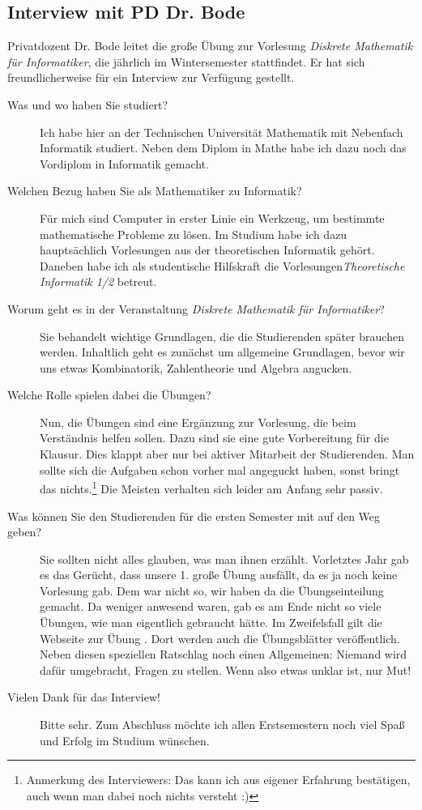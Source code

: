 \subsection{Interview mit PD Dr. Bode}
	Privatdozent Dr. Bode leitet die große Übung zur Vorlesung \emph{Diskrete Mathematik für Informatiker}, die jährlich im Wintersemester stattfindet. Er hat sich freundlicherweise für ein Interview zur Verfügung gestellt.
	\begin{description}
		\item[Was und wo haben Sie studiert?] 

		Ich habe hier an der Technischen Universität Mathematik mit Nebenfach Informatik studiert. Neben dem Diplom in Mathe habe ich dazu noch das Vordiplom in Informatik gemacht.
		\item[Welchen Bezug haben Sie als Mathematiker zu Informatik?] 

		Für mich sind Computer in erster Linie ein Werkzeug, um bestimmte mathematische Probleme zu lösen. Im Studium habe ich dazu hauptsächlich Vorlesungen aus der theoretischen Informatik gehört. Daneben habe ich als studentische Hilfskraft die Vorlesungen\emph{Theoretische Informatik 1/2} betreut.
		\item[Worum geht es in der Veranstaltung \emph{Diskrete Mathematik für Informatiker}?] 

		Sie behandelt wichtige Grundlagen, die die Studierenden später brauchen werden. Inhaltlich geht es zunächst um allgemeine Grundlagen, bevor wir uns etwas Kombinatorik, Zahlentheorie und Algebra angucken.
		\item[Welche Rolle spielen dabei die Übungen?] 

		Nun, die Übungen sind eine Ergänzung zur Vorlesung, die beim Verständnis helfen sollen. Dazu sind sie eine gute Vorbereitung für die Klausur. Dies klappt aber nur bei aktiver Mitarbeit der Studierenden. Man sollte sich die Aufgaben schon vorher mal angeguckt haben, sonst bringt das nichts.\footnote{Anmerkung des Interviewers: Das kann ich aus eigener Erfahrung bestätigen, auch wenn man dabei noch nichts versteht :)} Die Meisten verhalten sich leider am Anfang sehr passiv.
		\item[Was können Sie den Studierenden für die ersten Semester mit auf den Weg geben?] 

		Sie sollten  nicht alles glauben, was man ihnen erzählt. Vorletztes Jahr gab es das Gerücht, dass unsere 1. große Übung ausfällt, da es ja noch keine Vorlesung gab. Dem war nicht so, wir haben da die Übungseinteilung gemacht. Da weniger anwesend waren, gab es am Ende nicht so viele Übungen, wie man eigentlich gebraucht hätte. Im Zweifelsfall gilt die Webseite zur Übung . Dort werden auch die Übungsblätter veröffentlich.\\ Neben diesen speziellen Ratschlag noch einen Allgemeinen: Niemand wird dafür umgebracht, Fragen zu stellen. Wenn also etwas unklar ist, nur Mut!
		\item[Vielen Dank für das Interview!] 

		Bitte sehr. Zum Abschluss möchte ich allen Erstsemestern noch viel Spaß und Erfolg im Studium wünschen.
	\end{description}
